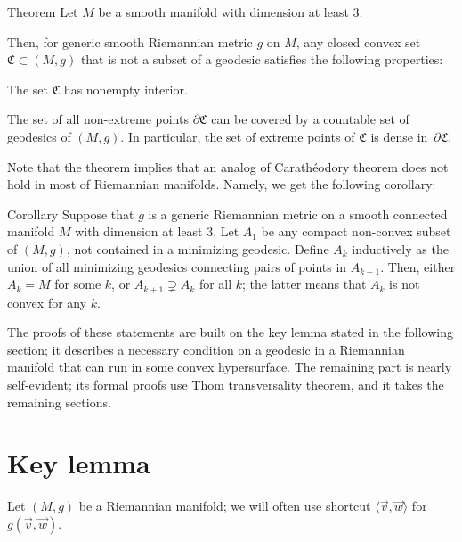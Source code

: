 \documentclass[a4paper,10pt]{article}
\begin{document}
\begin{thm}{Theorem}\label{thm:main}
Let $M$ be a smooth manifold with dimension at least 3.

Then, for generic smooth Riemannian metric $g$ on $M$,
any closed convex set $\mathfrak{C}\subset (M,g)$ that is not a subset of a geodesic
satisfies the following properties:

\begin{subthm}{}
The set $\mathfrak{C}$ has nonempty interior.
\end{subthm}

\begin{subthm}{}
The set of all non-extreme points $\partial\mathfrak{C}$ can be covered by a countable set of geodesics of $(M,g)$.
In particular, the set of extreme points of $\mathfrak{C}$ is dense in~$\partial\mathfrak{C}$.
\end{subthm}

\end{thm}

Note that the theorem implies that an analog of Carathéodory theorem does not hold in most of Riemannian manifolds.
Namely, we get the following corollary:

\begin{thm}{Corollary}\label{cor:caratheodory}
Suppose that $g$ is a generic Riemannian metric on a smooth connected manifold $M$ with dimension at least 3.
Let $A_1$ be any compact non-convex  subset of $(M,g)$, not contained in a minimizing  geodesic.
Define  $A_k$ inductively as  the union of all minimizing geodesics connecting pairs of  points in 
$A_{k-1}$.
Then, either $A_k=M$ for some $k$, or $A_{k+1}\supsetneq A_k$ for all $k$;
the latter means that $A_k$ is not convex for any $k$.
\end{thm}


The proofs of these statements are built on the key lemma stated in the following section; 
it describes a necessary condition on a geodesic in a Riemannian manifold that can run in some convex hypersurface.
The remaining part is nearly self-evident;
its formal proofs use Thom transversality theorem, and it takes the remaining sections.

\section{Key lemma}

Let $(M,g)$ be a Riemannian manifold;
we will often use shortcut $\langle \vec{v},\vec{w}\rangle$ for $g(\vec{v},\vec{w})$.
\end{document}
